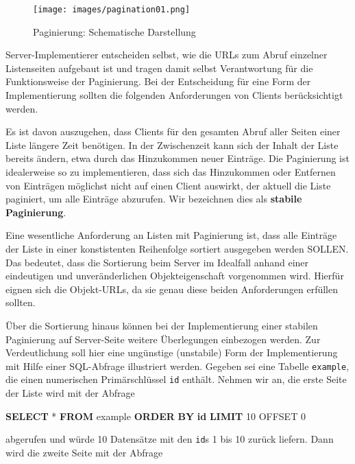 \documentclass[,a4paper]{article}
\makeatletter
\newenvironment{Shaded}{}{}
\newcommand{\KeywordTok}[1]{\textcolor[rgb]{0.00,0.44,0.13}{\textbf{{#1}}}}
\newcommand{\DecValTok}[1]{\textcolor[rgb]{0.25,0.63,0.44}{{#1}}}
\newcommand{\NormalTok}[1]{{#1}}
\def\maxwidth{\ifdim\Gin@nat@width>\linewidth\linewidth
\else\Gin@nat@width\fi}
\let\Oldincludegraphics\includegraphics
\renewcommand{\includegraphics}[1]{\Oldincludegraphics[width=\maxwidth]{#1}}
\makeatother
\begin{document}
\begin{figure}[htbp]
\centering
\texttt{[image: images/pagination01.png]}
\caption{Paginierung: Schematische Darstellung}
\end{figure}

Server-Implementierer entscheiden selbst, wie die URLs zum Abruf
einzelner Listenseiten aufgebaut ist und tragen damit selbst
Verantwortung für die Funktionsweise der Paginierung. Bei der
Entscheidung für eine Form der Implementierung sollten die folgenden
Anforderungen von Clients berücksichtigt werden.

Es ist davon auszugehen, dass Clients für den gesamten Abruf aller
Seiten einer Liste längere Zeit benötigen. In der Zwischenzeit kann sich
der Inhalt der Liste bereits ändern, etwa durch das Hinzukommen neuer
Einträge. Die Paginierung ist idealerweise so zu implementieren, dass
sich das Hinzukommen oder Entfernen von Einträgen möglichst nicht auf
einen Client auswirkt, der aktuell die Liste paginiert, um alle Einträge
abzurufen. Wir bezeichnen dies als \textbf{stabile Paginierung}.

Eine wesentliche Anforderung an Listen mit Paginierung ist, dass alle
Einträge der Liste in einer konstistenten Reihenfolge sortiert
ausgegeben werden SOLLEN. Das bedeutet, dass die Sortierung beim Server
im Idealfall anhand einer eindeutigen und unveränderlichen
Objekteigenschaft vorgenommen wird. Hierfür eignen sich die Objekt-URLs,
da sie genau diese beiden Anforderungen erfüllen sollten.

Über die Sortierung hinaus können bei der Implementierung einer stabilen
Paginierung auf Server-Seite weitere Überlegungen einbezogen werden. Zur
Verdeutlichung soll hier eine ungünstige (unstabile) Form der
Implementierung mit Hilfe einer SQL-Abfrage illustriert werden. Gegeben
sei eine Tabelle \texttt{example}, die einen numerischen Primärschlüssel
\texttt{id} enthält. Nehmen wir an, die erste Seite der Liste wird mit
der Abfrage

\begin{Shaded}
\begin{Highlighting}[]
\KeywordTok{SELECT} \NormalTok{* }\KeywordTok{FROM} \NormalTok{example }\KeywordTok{ORDER} \KeywordTok{BY} \KeywordTok{id} \KeywordTok{LIMIT} \DecValTok{10} \NormalTok{OFFSET }\DecValTok{0}
\end{Highlighting}
\end{Shaded}

abgerufen und würde 10 Datensätze mit den \texttt{id}s 1 bis 10 zurück
liefern. Dann wird die zweite Seite mit der Abfrage
\end{document}
